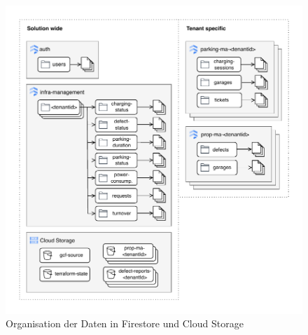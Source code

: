 \begin{figure}[H]
    \centering
    \includegraphics[width=\textwidth]{resources/data-model.drawio.pdf}
    \caption{Organisation der Daten in Firestore und Cloud Storage}
    \label{fig:data-model}
\end{figure}

